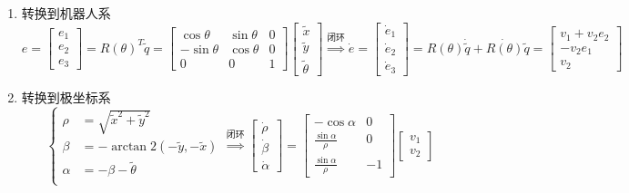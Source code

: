 \documentclass[
12pt, %
a4paper, 
oneside, %
headinclude,footinclude, %
]{scrartcl}
\begin{document}
\begin{enumerate}
\item 转换到机器人系
$$ 
e = \begin{bmatrix} e_1 \\ e_2 \\ e_3 \end{bmatrix} = R(\theta)^T \tilde{q} = \begin{bmatrix} \cos\theta & \sin\theta & 0 \\ -\sin\theta & \cos\theta & 0 \\ 0 & 0 & 1 \end{bmatrix} \begin{bmatrix} \tilde{x} \\ \tilde{y} \\ \tilde{\theta} \end{bmatrix}
\overset{\text{闭环}}{\Longrightarrow}
\dot{e} = \begin{bmatrix} \dot{e}_1 \\ \dot{e}_2 \\ \dot{e}_3 \end{bmatrix} = R(\theta)\dot{\tilde{q}} + \dot{R(\theta)}\tilde{q} = \begin{bmatrix} v_1 + v_2 e_2 \\ -v_2 e_1 \\ v_2 \end{bmatrix} 
$$
\item 转换到极坐标系
$$ 
\begin{cases}
\rho &= \sqrt{\tilde{x}^2 + \tilde{y}^2} \\
\beta &= -\arctan2(-\tilde{y},-\tilde{x}) \\
\alpha &= -\beta - \tilde{\theta} \\
\end{cases}
\overset{\text{闭环}}{\Longrightarrow}
\begin{bmatrix} \dot{\rho} \\ \dot{\beta} \\ \dot{\alpha} \end{bmatrix} = 
\begin{bmatrix} 
-\cos\alpha & 0 \\
\frac{\sin\alpha}{\rho} & 0 \\
\frac{\sin\alpha}{\rho} & -1
\end{bmatrix}
\begin{bmatrix} v_1 \\ v_2 \end{bmatrix}
$$ 
\end{enumerate}
\end{document}
